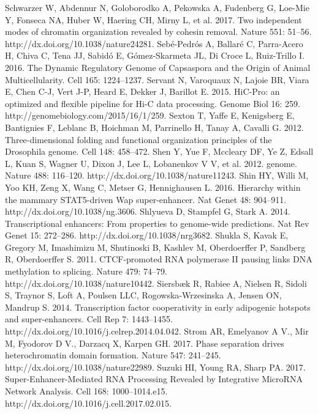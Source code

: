 \begin{thebibliography}{1}
	 Schwarzer W, Abdennur N, Goloborodko A, Pekowska A, Fudenberg G, Loe-Mie Y, Fonseca NA, Huber W, Haering CH, Mirny L, et al. 2017. Two independent modes of chromatin organization revealed by cohesin removal. Nature 551: 51–56. http://dx.doi.org/10.1038/nature24281.
	 Sebé-Pedrós A, Ballaré C, Parra-Acero H, Chiva C, Tena JJ, Sabidó E, Gómez-Skarmeta JL, Di Croce L, Ruiz-Trillo I. 2016. The Dynamic Regulatory Genome of Capsaspora and the Origin of Animal Multicellularity. Cell 165: 1224–1237.
	 Servant N, Varoquaux N, Lajoie BR, Viara E, Chen C-J, Vert J-P, Heard E, Dekker J, Barillot E. 2015. HiC-Pro: an optimized and flexible pipeline for Hi-C data processing. Genome Biol 16: 259. http://genomebiology.com/2015/16/1/259.
	 Sexton T, Yaffe E, Kenigsberg E, Bantignies F, Leblanc B, Hoichman M, Parrinello H, Tanay A, Cavalli G. 2012. Three-dimensional folding and functional organization principles of the Drosophila genome. Cell 148: 458–472.
	 Shen Y, Yue F, Mccleary DF, Ye Z, Edsall L, Kuan S, Wagner U, Dixon J, Lee L, Lobanenkov V V, et al. 2012. genome. Nature 488: 116–120. http://dx.doi.org/10.1038/nature11243.
	 Shin HY, Willi M, Yoo KH, Zeng X, Wang C, Metser G, Hennighausen L. 2016. Hierarchy within the mammary STAT5-driven Wap super-enhancer. Nat Genet 48: 904–911. http://dx.doi.org/10.1038/ng.3606.
	 Shlyueva D, Stampfel G, Stark A. 2014. Transcriptional enhancers: From properties to genome-wide predictions. Nat Rev Genet 15: 272–286. http://dx.doi.org/10.1038/nrg3682.
	 Shukla S, Kavak E, Gregory M, Imashimizu M, Shutinoski B, Kashlev M, Oberdoerffer P, Sandberg R, Oberdoerffer S. 2011. CTCF-promoted RNA polymerase II pausing links DNA methylation to splicing. Nature 479: 74–79. http://dx.doi.org/10.1038/nature10442.
	 Siersbæk R, Rabiee A, Nielsen R, Sidoli S, Traynor S, Loft A, Poulsen LLC, Rogowska-Wrzesinska A, Jensen ON, Mandrup S. 2014. Transcription factor cooperativity in early adipogenic hotspots and super-enhancers. Cell Rep 7: 1443–1455. http://dx.doi.org/10.1016/j.celrep.2014.04.042.
	 Strom AR, Emelyanov A V., Mir M, Fyodorov D V., Darzacq X, Karpen GH. 2017. Phase separation drives heterochromatin domain formation. Nature 547: 241–245. http://dx.doi.org/10.1038/nature22989.
	 Suzuki HI, Young RA, Sharp PA. 2017. Super-Enhancer-Mediated RNA Processing Revealed by Integrative MicroRNA Network Analysis. Cell 168: 1000–1014.e15. http://dx.doi.org/10.1016/j.cell.2017.02.015.

\end{thebibliography}
